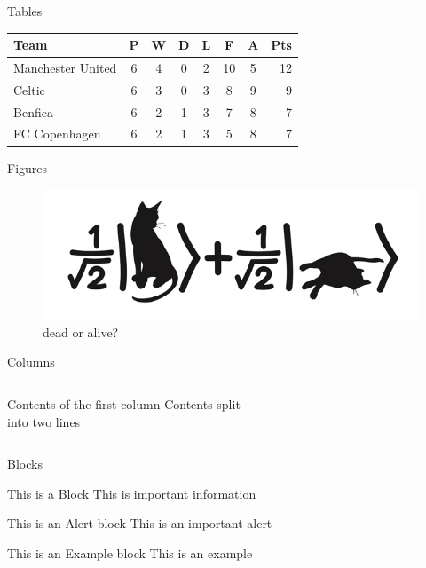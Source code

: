 \documentclass[xcolor={dvipsnames},10pt]{beamer}
\begin{document}
\begin{frame}{Tables}

    \begin{table}
        \begin{tabular}{l*{6}{c}r}
            \toprule
            Team              & P & W & D & L & F  & A & Pts \\
            \midrule
            Manchester United & 6 & 4 & 0 & 2 & 10 & 5 & 12  \\
            Celtic            & 6 & 3 & 0 & 3 &  8 & 9 &  9  \\
            Benfica           & 6 & 2 & 1 & 3 &  7 & 8 &  7  \\
            FC Copenhagen     & 6 & 2 & 1 & 3 &  5 & 8 &  7  \\
            \bottomrule
        \end{tabular}
    \end{table}

\end{frame}

\begin{frame}{Figures}
    \begin{figure}[ht!]
        \centering
        \includegraphics[width=\textwidth]{cat.jpg}
        \caption{dead or alive?}
    \end{figure}
\end{frame}

\begin{frame}{Columns}
    \begin{columns}[T,onlytextwidth]
        Contents of the first column
        Contents split \\ into two lines
    \end{columns}
\end{frame}

\begin{frame}{Blocks}

    \begin{block}{This is a Block}
        This is important information
    \end{block}

    \begin{alertblock}{This is an Alert block}
        This is an important alert
    \end{alertblock}

    \begin{exampleblock}{This is an Example block}
        This is an example
    \end{exampleblock}

\end{frame}
\end{document}
